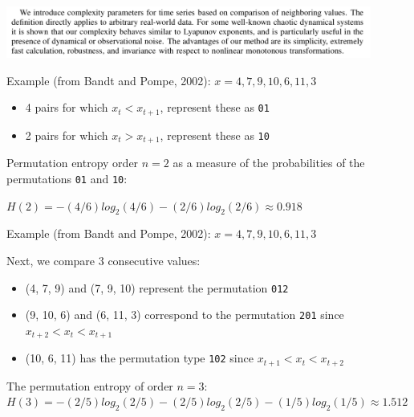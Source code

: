 \documentclass[aspectratio=169]{beamer}
\begin{document}
\begin{frame}

\begin{center}
\includegraphics[width = 0.9\textwidth]{figures/bandt_permutation_2002_abstract}
\end{center}

\end{frame}
\begin{frame}

Example (from Bandt and Pompe, 2002):
$x = 4, 7, 9, 10, 6, 11, 3$

\begin{itemize}
\item 4 pairs for which $x_t < x_{t+1}$, represent these as \texttt{01}
\pause
\item 2 pairs for which $x_t > x_{t+1}$, represent these as \texttt{10}
\end{itemize}
\pause
Permutation entropy order $n = 2$ as a measure of the probabilities of the permutations \texttt{01} and \texttt{10}:

$H(2) = -(4/6) log_2(4/6) - (2/6) log_2(2/6) \approx 0.918$

\end{frame}
\begin{frame}

Example (from Bandt and Pompe, 2002):
$x = 4, 7, 9, 10, 6, 11, 3$

Next, we compare 3 consecutive values:
\begin{itemize}
\item (4, 7, 9) and (7, 9, 10) represent the permutation \texttt{012}
\item (9, 10, 6) and (6, 11, 3) correspond to the permutation \texttt{201} since $x_{t+2} <  x_{t} < x_{t+1}$ 
\item (10, 6, 11) has the permutation type \texttt{102}  since $x_{t+1} <  x_{t} < x_{t+2}$ 
\end{itemize}

The permutation entropy of order $n=3$:
$H(3) = -(2/5) log_2(2/5) - (2/5)log_2(2/5) - (1/5)log_2(1/5) \approx 1.512$

\end{frame}
\end{document}
